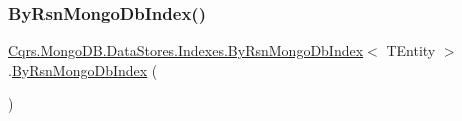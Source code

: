 \subsubsection{\texorpdfstring{By\+Rsn\+Mongo\+Db\+Index()}{ByRsnMongoDbIndex()}}
{\footnotesize\ttfamily \hyperlink{classCqrs_1_1MongoDB_1_1DataStores_1_1Indexes_1_1ByRsnMongoDbIndex}{Cqrs.\+Mongo\+D\+B.\+Data\+Stores.\+Indexes.\+By\+Rsn\+Mongo\+Db\+Index}$<$ T\+Entity $>$.\hyperlink{classCqrs_1_1MongoDB_1_1DataStores_1_1Indexes_1_1ByRsnMongoDbIndex}{By\+Rsn\+Mongo\+Db\+Index} (\begin{DoxyParamCaption}{ }\end{DoxyParamCaption})\hspace{0.3cm}{\ttfamily [protected]}}

